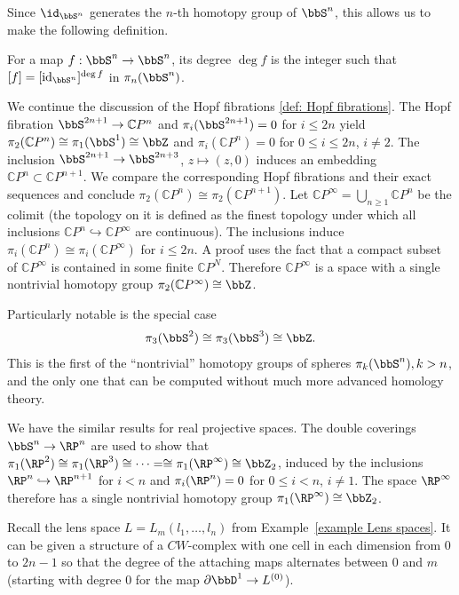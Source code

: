 Since $\id_{\bbS^n}$ generates the $n$-th homotopy group of $\bbS^n$, this allows us to make the following definition.

\begin{defn}
    For a map $f:\bbS^n\to \bbS^n$, its degree $\deg f$ is the integer such that $[f]=[\mathrm{id}_{\bbS^n}]^{\deg f}$ in $\pi_n(\bbS^n)$.
\end{defn}

\begin{example}\label{example Hopf pi3(S2)}
    We continue the discussion of the Hopf fibrations \ref{def: Hopf fibrations}. The Hopf fibration $\bbS^{2n+1}\to \mathbb{C}P^n$ and $\pi_i(\bbS^{2n+1})=0$ for $i\leq 2n$ yield $\pi_2(\mathbb{C}P^n)\cong \pi_1(\bbS^1)\cong \bbZ$ and $\pi_i(\mathbb{C}P^n)=0$ for $0\leq i \leq 2n$, $i\neq 2$. The inclusion $\bbS^{2n+1}\to \bbS^{2n+3}$, $z\mapsto (z,0)$ induces an embedding $\mathbb{C}P^n\subset \mathbb{C}P^{n+1}$. We compare the corresponding Hopf fibrations and their exact sequences and conclude $\pi_2(\mathbb{C}P^n)\cong \pi_2(\mathbb{C}P^{n+1})$. Let $\mathbb{C}P^\infty =\bigcup_{n\geq 1}\mathbb{C}P^n$ be the colimit (the topology on it is defined as the finest topology under which all inclusions $\mathbb{C}P^n\hookrightarrow \mathbb{C}P^\infty$ are continuous). The inclusions induce $\pi_i(\mathbb{C}P^n)\cong\pi_i(\mathbb{C}P^\infty)$ for $i\leq 2n$. A proof uses the fact that a compact subset of $\mathbb{C}P^\infty$ is contained in some finite $\mathbb{C}P^N$. Therefore $\mathbb{C}P^\infty$ is a space with a single nontrivial homotopy group $\pi_2(\mathbb{C}P^\infty)\cong\bbZ$.

    Particularly notable is the special case 
    \[\pi_3(\bbS^2)\cong \pi_3(\bbS^3)\cong\bbZ.\]
    This is the first of the ``nontrivial'' homotopy groups of spheres $\pi_k(\bbS^n), k>n$, and the only one that can be computed without much more advanced homology theory.

    We have the similar results for real projective spaces. The double coverings $\bbS^n\to \RP^n$ are used to show that $\pi_1(\RP^2)\cong \pi_1(\RP^3)\cong\cdots =\cong \pi_1(\RP^\infty)\cong \bbZ_2$, induced by the inclusions $\RP^n\hookrightarrow\RP^{n+1}$ for $i<n$ and $\pi_i(\RP^n)=0$ for $0\leq i< n$, $i\neq 1$. The space $\RP^\infty$ therefore has a single nontrivial homotopy group $\pi_1(\RP^\infty)\cong\bbZ_2$.
\end{example}


\begin{example}
    Recall the lens space $L=L_m(l_1,\ldots,l_n)$ from Example~\ref{example Lens spaces}. It can be given a structure of a $CW$-complex with one cell in each dimension from $0$ to $2n-1$ so that the degree of the attaching maps alternates between $0$ and $m$ (starting with degree $0$ for the map $\partial \bbD^1\to L^{(0)}$).
\end{example}


